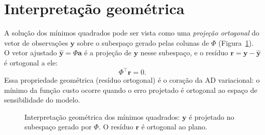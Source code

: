 \section{Interpretação geométrica}
A solução dos mínimos quadrados pode ser vista como uma \emph{projeção ortogonal} do vetor de observações $\mathbf{y}$ sobre o subespaço gerado pelas colunas de $\Phi$ (Figura~\ref{fig:geom-ls}).  
O vetor ajustado $\hat{\mathbf{y}} = \Phi\mathbf{a}$ é a projeção de $\mathbf{y}$ nesse subespaço, e o resíduo $\boldsymbol{r} = \mathbf{y}-\hat{\mathbf{y}}$ é ortogonal a ele:
\[
\Phi^\top \boldsymbol{r} = 0.
\]
Essa propriedade geométrica (resíduo ortogonal) é o coração da AD variacional: o mínimo da função custo ocorre quando o erro projetado é ortogonal ao espaço de sensibilidade do modelo.

\begin{figure}[h!]
\centering
{}
\caption{Interpretação geométrica dos mínimos quadrados: $\mathbf{y}$ é projetado no subespaço gerado por $\Phi$. O resíduo $\boldsymbol{r}$ é ortogonal ao plano.}
\label{fig:geom-ls}
\end{figure}

